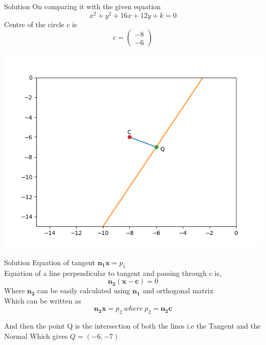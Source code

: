 \documentclass{beamer}
\begin{document}
\begin{frame}{Solution}
On comparing it with the given equation
\begin{equation}
  x^2 + y^2 + 16x + 12y + k = 0  
\end{equation}
Centre of the circle c is
\begin{equation}
    c = \begin{pmatrix} -8 \\ -6 \end{pmatrix}
\end{equation}
\begin{center}
      \includegraphics[scale =0.35]{Fig2.png}
\end{center}

\end{frame}

\begin{frame}{Solution}
Equation of tangent $\mathbf{n_{1}}\mathbf{x} = p_{1}$\\
Equation of a line perpendicular to tangent and passing through c is,
\begin{equation}
    \mathbf{n_{2}}(\mathbf{x} - \mathbf{c}) = 0
\end{equation}
Where $\mathbf{n_{2}}$ can be easily calculated using $\mathbf{n_{1}}$ and orthogonal matrix\\

Which can be written as 
\begin{equation}
\mathbf{n_{2}}\mathbf{x} = p_{2} \ where\ p_{2} = \mathbf{n_{2}}\mathbf{c} 
\end{equation}
 
And then the point Q is the intersection of both the lines i.e the Tangent and the Normal
Which gives  $ Q = (-6, -7) $ 
    
\end{frame}
\end{document}
